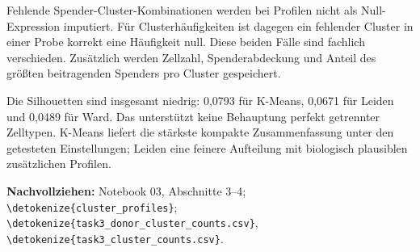 \documentclass[11pt,a4paper]{article}
\newcommand{\code}[1]{\expandafter\nolinkurl\expandafter{\detokenize{#1}}}
\newcommand{\source}[1]{\par{\footnotesize\raggedright\color{muted}\textbf{Nachvollziehen:} #1\par}}
\begin{document}
Fehlende Spender-Cluster-Kombinationen werden bei Profilen nicht als
Null-Expression imputiert. Für Clusterhäufigkeiten ist dagegen ein fehlender
Cluster in einer Probe korrekt eine Häufigkeit null. Diese beiden Fälle
sind fachlich verschieden. Zusätzlich werden Zellzahl, Spenderabdeckung
und Anteil des größten beitragenden Spenders pro Cluster gespeichert.

Die Silhouetten sind insgesamt niedrig: 0,0793 für K-Means, 0,0671 für
Leiden und 0,0489 für Ward. Das unterstützt keine Behauptung perfekt
getrennter Zelltypen. K-Means liefert die stärkste kompakte Zusammenfassung
unter den getesteten Einstellungen; Leiden eine feinere Aufteilung mit
biologisch plausiblen zusätzlichen Profilen.
\source{Notebook 03, Abschnitte 3--4; \code{cluster_profiles};
\code{task3_donor_cluster_counts.csv}, \code{task3_cluster_counts.csv}.}

\clearpage
\end{document}
